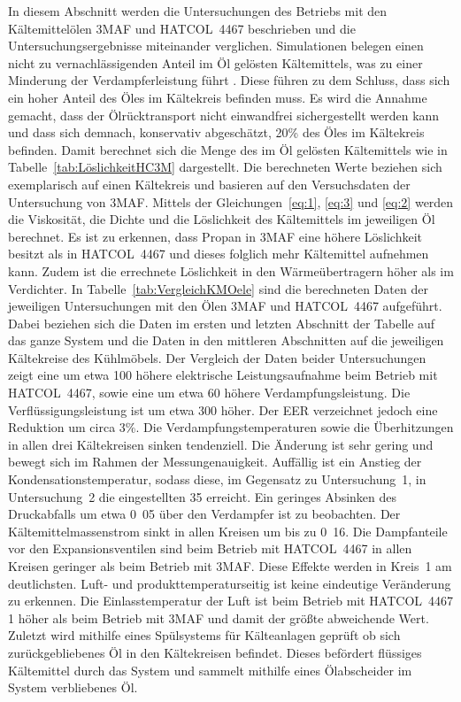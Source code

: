 In diesem Abschnitt werden die Untersuchungen des Betriebs mit den Kältemittelölen 3MAF und HATCOL~4467 beschrieben und die Untersuchungsergebnisse miteinander verglichen.
Simulationen belegen einen nicht zu vernachlässigenden Anteil im Öl gelösten Kältemittels, was zu einer Minderung der Verdampferleistung führt  \cite{Universitatpolitecnicadevalencia.2017}. Diese führen zu dem Schluss, dass sich ein hoher Anteil des Öles im Kältekreis befinden muss. Es wird die Annahme gemacht, dass der Ölrücktransport nicht einwandfrei sichergestellt werden kann und dass sich demnach, konservativ abgeschätzt, \unit{20}{\%} des Öles im Kältekreis befinden. Damit berechnet sich die Menge des im Öl gelösten Kältemittels wie in Tabelle~\ref{tab:LöslichkeitHC3M} dargestellt.
Die berechneten Werte beziehen sich exemplarisch auf einen Kältekreis und basieren auf den Versuchsdaten der Untersuchung von 3MAF.
Mittels der Gleichungen~\ref{eq:1}, \ref{eq:3} und \ref{eq:2} werden die Viskosität, die Dichte und die Löslichkeit des Kältemittels im jeweiligen Öl berechnet. Es ist zu erkennen, dass Propan in 3MAF eine höhere Löslichkeit besitzt als in HATCOL~4467 und dieses folglich mehr Kältemittel aufnehmen kann. Zudem ist die errechnete Löslichkeit in den Wärmeübertragern höher als im Verdichter. \newline
In Tabelle~\ref{tab:VergleichKMOele} sind die berechneten Daten der jeweiligen Untersuchungen mit den Ölen 3MAF und HATCOL~4467 aufgeführt. Dabei beziehen sich die Daten im ersten und letzten Abschnitt der Tabelle auf das ganze System und die Daten in den mittleren Abschnitten auf die jeweiligen Kältekreise des Kühlmöbels.
Der Vergleich der Daten beider Untersuchungen zeigt eine um etwa \unit{100}{\watt} höhere elektrische Leistungsaufnahme beim Betrieb mit HATCOL~4467, sowie eine um etwa \unit{60}{\watt} höhere Verdampfungsleistung. Die Verflüssigungsleistung ist um etwa \unit{300}{\watt} höher. Der EER verzeichnet jedoch eine Reduktion um circa \unit{3}{\%}. Die Verdampfungstemperaturen sowie die Überhitzungen in allen drei Kältekreisen sinken tendenziell. Die Änderung ist sehr gering und bewegt sich im Rahmen der Messungenauigkeit. \newline
Auffällig ist ein Anstieg der Kondensationstemperatur, sodass diese, im Gegensatz zu Untersuchung~1, in Untersuchung~2 die eingestellten \unit{35}{\celsius} erreicht. Ein geringes Absinken des Druckabfalls um etwa \unit{0.05}{\bbar} über den Verdampfer ist zu beobachten. Der Kältemittelmassenstrom sinkt in allen Kreisen um bis zu \unit{0.16}{\metre\per\second}. Die Dampfanteile vor den Expansionsventilen sind beim Betrieb mit HATCOL~4467 in allen Kreisen geringer als beim Betrieb mit 3MAF. Diese Effekte werden in Kreis~1 am deutlichsten. 
Luft- und produkttemperaturseitig ist keine eindeutige Veränderung zu erkennen. 
Die Einlasstemperatur der Luft ist beim Betrieb mit HATCOL~4467 \unit{1}{\kelvin} höher als beim Betrieb mit 3MAF und damit der größte abweichende Wert. \newline
Zuletzt wird mithilfe eines Spülsystems für Kälteanlagen geprüft ob sich zurückgebliebenes Öl in den Kältekreisen befindet. Dieses befördert flüssiges Kältemittel durch das System und sammelt mithilfe eines Ölabscheider im System verbliebenes Öl.


